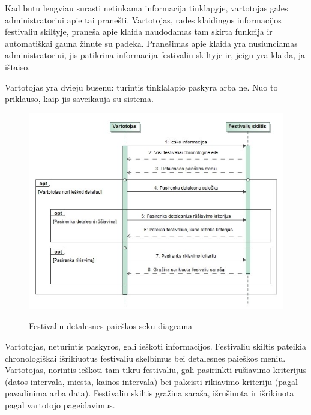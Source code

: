 ﻿\documentclass{VUMIFPSkursinis}
\begin{document}
Kad butu lengviau surasti netinkama informacija tinklapyje, vartotojas gales administratoriui apie tai pranešti. Vartotojas, rades klaidingos informacijos festivaliu skiltyje, praneša apie klaida naudodamas tam skirta funkcija ir automatiškai gauna žinute su padeka. Pranešimas apie klaida yra nusiunciamas administratoriui, jis patikrina informacija festivaliu skiltyje ir, jeigu yra klaida, ja ištaiso.

Vartotojas yra dvieju busenu: turintis tinklalapio paskyra arba ne. Nuo to priklauso, kaip jis saveikauja su sistema. 

\begin{figure}[H]
    \centering
    \includegraphics[scale=0.7]{img/geri/KlientPaieska}
    \label{img:uml23}
	\caption{Festivaliu detalesnes paieškos seku diagrama}
\end{figure}

Vartotojas, neturintis paskyros, gali ieškoti informacijos. Festivaliu skiltis pateikia chronologiškai išrikiuotus festivaliu skelbimus bei detalesnes paieškos meniu. Vartotojas, norintis ieškoti tam tikru festivaliu, gali pasirinkti rušiavimo kriterijus (datos intervala, miesta, kainos intervala) bei pakeisti rikiavimo kriteriju (pagal pavadinima arba data). Festivaliu skiltis gražina saraša, išrušiuota ir išrikiuota pagal vartotojo pageidavimus.
\end{document}
